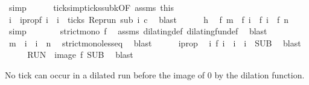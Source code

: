 \begin{isabellebody}
\ simp\isanewline
\ \ \ \ \isamarkupfalse%
\ ticks{\isacharunderscore}imp{\isacharunderscore}ticks{\isacharunderscore}subk{\isacharbrackleft}OF\ assms\ this{\isacharbrackright}\isanewline
\ \ \ \ \ \ \isamarkupfalse%
\ i\ \ i{}prop{\isacharcolon}{\isacartoucheopen}f\ i\ {\isacharequal}\ i\ {\isasymand}\ ticks\ {\isacharparenleft}{\isacharparenleft}Rep{\isacharunderscore}run\ sub{\isacharparenright}\ i\ c{\isacharparenright}{\isacartoucheclose}\ \isamarkupfalse%
\ blast\isanewline
\ \ \ \ \isamarkupfalse%
\ h\ \isamarkupfalse%
\ {\isacartoucheopen}f\ m\ {\isasymle}\ f\ i\ {\isasymand}\ f\ i\ {\isasymle}\ f\ n{\isacartoucheclose}\ \isamarkupfalse%
\ simp\isanewline
\ \ \ \ \isamarkupfalse%
\ \isamarkupfalse%
\ {\isacartoucheopen}strict{\isacharunderscore}mono\ f{\isacartoucheclose}\ \isamarkupfalse%
\ assms\ dilating{\isacharunderscore}def\ dilating{\isacharunderscore}fun{\isacharunderscore}def\ \isamarkupfalse%
\ blast\isanewline
\ \ \ \ \isamarkupfalse%
\ \isamarkupfalse%
\ {\isacartoucheopen}m\ {\isasymle}\ i\ {\isasymand}\ i\ {\isasymle}\ n{\isacartoucheclose}\ \isamarkupfalse%
\ strict{\isacharunderscore}mono{\isacharunderscore}less{\isacharunderscore}eq\ \isamarkupfalse%
\ blast\isanewline
\ \ \ \ \isamarkupfalse%
\ i{}prop\ \isamarkupfalse%
\ {\isacartoucheopen}{\isasymexists}i\ f\ i\ {\isacharequal}\ i\ {\isasymand}\ i\ {\isasymin}\ {\isacharquery}SUB{\isacartoucheclose}\ \isamarkupfalse%
\ blast\isanewline
\ \ \isacommand{{\isacharbraceright}}\isamarkupfalse%
\ \isamarkupfalse%
\ {\isacartoucheopen}{\isacharquery}RUN\ {\isasymsubseteq}\ image\ f\ {\isacharquery}SUB{\isacartoucheclose}\ \isamarkupfalse%
\ blast\isanewline
{}\isamarkupfalse%
%
\endisatagproof
{\isafoldproof}%
%
\isadelimproof
%
\endisadelimproof
%
\begin{isamarkuptext}%
No tick can occur in a dilated run before the image of 0 by the dilation function.%
\end{isamarkuptext}\isamarkuptrue%

\end{isabellebody}
